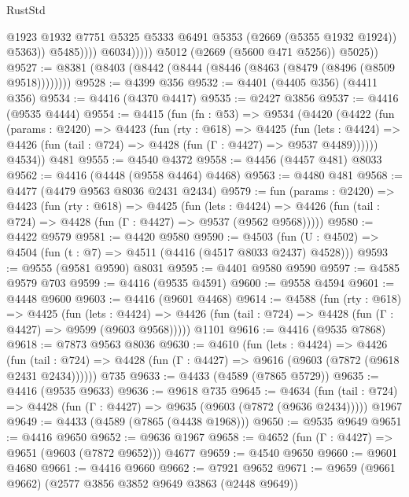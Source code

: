 \begin{lexlean}{RustStd}
\begin{coremodule}
                              @1923
                              @1932
                              @7751
                              @5325
                              @5333
                              @6491
                              @5353
                              (@2669 (@5355 @1932 @1924))
                              @5363))
                          @5485))))
                  @6034)))))
        @5012
        (@2669 (@5600 @471 @5256))
        @5025))
@9527 := @8381 (@8403 (@8442 (@8444 (@8446 (@8463 (@8479 (@8496 (@8509 @9518))))))))
@9528 := @4399 @356
@9532 := @4401 (@4405 @356) (@4411 @356)
@9534 := @4416 (@4370 @4417)
@9535 := @2427 @3856
@9537 := @4416 (@9535 @4444)
@9554 := @4415
    (fun (fn : @53) =>
    @9534
      (@4420
        (@4422
          (fun (params : @2420) =>
          @4423
            (fun (rty : @618) =>
            @4425
              (fun (lets : @4424) =>
              @4426 (fun (tail : @724) => @4428 (fun (Γ : @4427) => @9537 @4489))))))
        @4534))
    @481
@9555 := @4540 @4372
@9558 := @4456 (@4457 @481) @8033
@9562 := @4416 (@4448 (@9558 @4464) @4468)
@9563 := @4480 @481
@9568 := @4477 (@4479 @9563 @8036 @2431 @2434)
@9579 := fun (params : @2420) =>
  @4423
    (fun (rty : @618) =>
    @4425
      (fun (lets : @4424) =>
      @4426 (fun (tail : @724) => @4428 (fun (Γ : @4427) => @9537 (@9562 @9568)))))
@9580 := @4422 @9579
@9581 := @4420 @9580
@9590 := @4503 (fun (U : @4502) => @4504 (fun (t : @7) => @4511 (@4416 (@4517 @8033 @2437) @4528)))
@9593 := @9555 (@9581 @9590) @8031
@9595 := @4401 @9580 @9590
@9597 := @4585 @9579 @703
@9599 := @4416 (@9535 @4591)
@9600 := @9558 @4594
@9601 := @4448 @9600
@9603 := @4416 (@9601 @4468)
@9614 := @4588
    (fun (rty : @618) =>
    @4425
      (fun (lets : @4424) =>
      @4426 (fun (tail : @724) => @4428 (fun (Γ : @4427) => @9599 (@9603 @9568)))))
    @1101
@9616 := @4416 (@9535 @7868)
@9618 := @7873 @9563 @8036
@9630 := @4610
    (fun (lets : @4424) =>
    @4426
      (fun (tail : @724) => @4428 (fun (Γ : @4427) => @9616 (@9603 (@7872 (@9618 @2431 @2434))))))
    @735
@9633 := @4433 (@4589 (@7865 @5729))
@9635 := @4416 (@9535 @9633)
@9636 := @9618 @735
@9645 := @4634
    (fun (tail : @724) => @4428 (fun (Γ : @4427) => @9635 (@9603 (@7872 (@9636 @2434)))))
    @1967
@9649 := @4433 (@4589 (@7865 (@4438 @1968)))
@9650 := @9535 @9649
@9651 := @4416 @9650
@9652 := @9636 @1967
@9658 := @4652 (fun (Γ : @4427) => @9651 (@9603 (@7872 @9652))) @4677
@9659 := @4540 @9650
@9660 := @9601 @4680
@9661 := @4416 @9660
@9662 := @7921 @9652
@9671 := @9659 (@9661 @9662) (@2577 @3856 @3852 @9649 @3863 (@2448 @9649))

\end{coremodule}
\end{lexlean}
